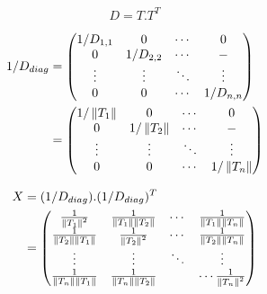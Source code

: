 \begin{latin}
    \begin{equation}
      D = T . T^{T}
    \end{equation}
\end{latin}
\begin{latin}
    \begin{equation}
    \begin{aligned}
      1 / D_{diag} &=
        \begin{pmatrix}
        1/D_{1,1} & 0 & \cdots & 0 \\
        0 & 1/D_{2,2} & \cdots & - \\
        \vdots  & \vdots  & \ddots & \vdots  \\
        0 & 0 & \cdots & 1/D_{n,n}
        \end{pmatrix} \\
        &=
        \begin{pmatrix}
        1/\left\lVert T_{1}\right\rVert & 0 & \cdots & 0 \\
        0 & 1/\left\lVert T_{2}\right\rVert & \cdots & - \\
        \vdots  & \vdots  & \ddots & \vdots  \\
        0 & 0 & \cdots & 1/\left\lVert T_{n}\right\rVert
        \end{pmatrix}
    \end{aligned}
    \end{equation}
\end{latin}
\begin{latin}
    \begin{equation}
    \begin{aligned}
      X &= (1/D_{diag}).(1/D_{diag})^{T} \\
      &= \begin{pmatrix}
          \frac{1} {\left\lVert T_{1}\right\rVert^{2}} & \frac{1}{\left\lVert T_{1}\right\rVert\left\lVert T_{2}\right\rVert} & \cdots & \frac{1}{\left\lVert T_{1}\right\rVert\left\lVert T_{n}\right\rVert} \\
          \frac{1}{\left\lVert T_{2}\right\rVert\left\lVert T_{1}\right\rVert} & \frac{1}{\left\lVert T_{2}\right\rVert^{2}} & \cdots & \frac{1}{\left\lVert T_{2}\right\rVert\left\lVert T_{n}\right\rVert} \\
        \vdots  & \vdots  & \ddots & \vdots  \\
          \frac{1}{\left\lVert T_{n}\right\rVert\left\lVert T_{1}\right\rVert} & \frac{1}{\left\lVert T_{n}\right\rVert\left\lVert T_{2}\right\rVert} & & \cdots \frac{1}{\left\lVert T_{n}\right\rVert^{2}} \\
        \end{pmatrix} \\
    \end{aligned}
    \end{equation}
\end{latin}
